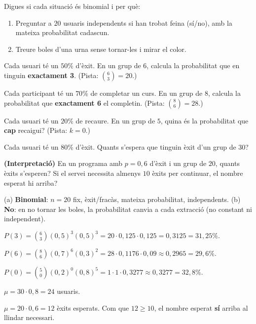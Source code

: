 \begin{exercicis}
\begin{exlist}
  \item Digues si cada situació és binomial i per què:
        \begin{enumerate}[label=\alph*), leftmargin=1.6em, topsep=2pt]
          \item Preguntar a $20$ usuaris independents si han trobat feina (sí/no), amb la
                mateixa probabilitat cadascun.
          \item Treure boles d'una urna sense tornar-les i mirar el color.
        \end{enumerate}
  \item Cada usuari té un $50\%$ d'èxit. En un grup de $6$, calcula la probabilitat que
        en tinguin \textbf{exactament 3}. (Pista: $\binom{6}{3}=20$.)
  \item Cada participant té un $70\%$ de completar un curs. En un grup de $8$, calcula la
        probabilitat que \textbf{exactament 6} el completin. (Pista: $\binom{8}{6}=28$.)
  \item Cada usuari té un $20\%$ de recaure. En un grup de $5$, quina és la probabilitat
        que \textbf{cap} recaigui? (Pista: $k=0$.)
  \item Cada usuari té un $80\%$ d'èxit. Quants s'espera que tinguin èxit d'un grup de
        $30$?
  \item \textbf{(Interpretació)} En un programa amb $p=0,6$ d'èxit i un grup de $20$,
        quants èxits s'esperen? Si el servei necessita almenys $10$ èxits per continuar,
        el nombre esperat hi arriba?
\end{exlist}
\end{exercicis}

\begin{solucions}
\begin{sollist}
  \item (a) \textbf{Binomial}: $n=20$ fix, èxit/fracàs, mateixa probabilitat,
        independents. (b) \textbf{No}: en no tornar les boles, la probabilitat canvia a
        cada extracció (no constant ni independent).
  \item $P(3)=\binom{6}{3}(0,5)^3(0,5)^3=20\cdot 0,125\cdot 0,125=0,3125=31,25\%$.
  \item $P(6)=\binom{8}{6}(0,7)^6(0,3)^2=28\cdot 0,1176\cdot 0,09\approx 0,2965=29,6\%$.
  \item $P(0)=\binom{5}{0}(0,2)^0(0,8)^5=1\cdot 1\cdot 0,3277\approx 0,3277=32,8\%$.
  \item $\mu=30\cdot 0,8=24$ usuaris.
  \item $\mu=20\cdot 0,6=12$ èxits esperats. Com que $12\ge 10$, el nombre esperat
        \textbf{sí} arriba al llindar necessari.
\end{sollist}
\end{solucions}
